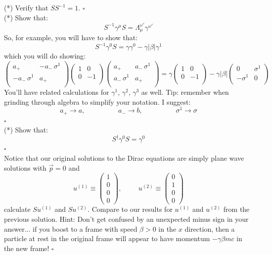 \documentclass[12pt]{article}
\begin{document}
\exercise (*) Verify that $S S^{-1} = 1$. $\square$\\[5pt]

\exercise (*)  Show that:
$$S^{-1} \gamma^\mu S = \Lambda_{\mu}^{\omega'} \gamma^{\omega'}$$
So, for example, you will have to show that:
$$S^{-1} \gamma^0 S = \gamma \gamma^{0} - \gamma |\beta| \gamma^1$$
which you will do showing:
$$
\begin{pmatrix}
a_+ & -a_- \, \sigma^1 \\
-a_- \, \sigma^1 & a_+ \\
\end{pmatrix}
\begin{pmatrix}
1 & 0  \\
0 & -1\\
\end{pmatrix}
\begin{pmatrix}
a_+ & a_- \, \sigma^1 \\
a_- \, \sigma^1 & a_+ \\
\end{pmatrix}
=
\gamma \begin{pmatrix}
1 & 0  \\
0 & -1\\
\end{pmatrix}
- \gamma |\beta|
\begin{pmatrix}
0 & \sigma^1  \\
-\sigma^1 & 0\\
\end{pmatrix}
$$
You'll have related calculations for $\gamma^1$, $\gamma^2$, $\gamma^3$ as well.  Tip:  remember when grinding through algebra to simplify your notation.  I suggest:
$$a_+ \to a, \hspace{2cm} a_- \to b, \hspace{2cm} \sigma^1 \to \sigma$$
$\square$\\[5pt]
\exercise (*) Show that:
$$S^{\dagger} \gamma^0 S = \gamma^0$$
$\square$\\[5pt]

\exercise Notice that our original solutions to the Dirac equations are simply plane wave solutions with $\vec{p}=0$ and
$$u^{(1)} \equiv \begin{pmatrix}1 \\ 0 \\ 0 \\ 0 \end{pmatrix},
\hspace{1cm}
u^{(2)} \equiv \begin{pmatrix}0 \\ 1 \\ 0 \\ 0 \end{pmatrix}
$$
calculate $S u^{(1)}$ and $ S u^{(2)}$.  Compare to our results for $u^{(1)}$ and $u^{(2)}$ from the previous solution.  Hint: Don't get confused by an unexpected minus sign in your answer... if you boost to a frame with speed $\beta > 0$ in the $x$ direction, then a particle at rest in the original frame will appear to have momentum $-\gamma\beta m c$ in the new frame! $\square$\\[5pt]
\end{document}
